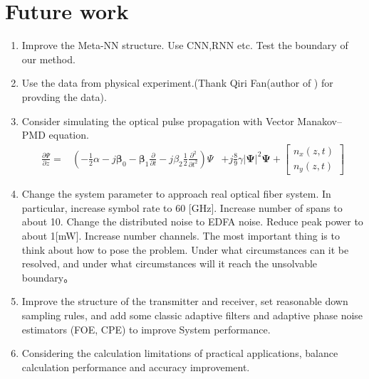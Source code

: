 \newpage
\section{Future work}
\begin{enumerate}
\item Improve the Meta-NN structure. Use CNN,RNN etc. Test the boundary of our method.
\item Use the data from physical experiment.(Thank Qiri Fan(author of \cite{fan2020NC}) for provding the data).
\item Consider simulating the optical pulse propagation with Vector Manakov–PMD equation.
$$
\begin{aligned}
\frac{\partial \Psi}{\partial z}=&\left(-\frac{1}{2} \alpha-j \boldsymbol{\beta}_{0}-\boldsymbol{\beta}_{1} \frac{\partial}{\partial t}-j \beta_{2} \frac{1}{2} \frac{\partial^{2}}{\partial t^{2}}\right) \Psi 
&+j \frac{8}{9} \gamma|\boldsymbol{\Psi}|^{2} \boldsymbol{\Psi}+\left[\begin{array}{l}
n_{x}(z, t) \\
n_{y}(z, t)
\end{array}\right]
\end{aligned}
$$
\item Change the system parameter to approach real optical fiber system. In particular, increase 
symbol rate to 60 [GHz]. Increase number of spans to about 10. Change the distributed noise to EDFA noise.
Reduce peak power to about 1[mW]. Increase number channels. The most important thing is to think about how
to pose the problem. Under what circumstances can it be resolved, and under what circumstances will it reach the unsolvable boundary。
\item Improve the structure of the transmitter and receiver, set reasonable down sampling rules, and add some classic adaptive filters and adaptive phase noise estimators (FOE, CPE) to improve
System performance.
\item Considering the calculation limitations of practical applications, balance calculation performance and accuracy improvement.
\end{enumerate}


